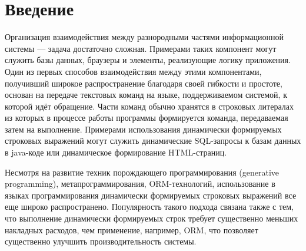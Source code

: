 \section*{Введение}
Организация взаимодействия между разнородными частями информационной системы — задача достаточно сложная. Примерами таких компонент могут служить базы данных, браузеры и элементы, реализующие логику приложения. Один из первых способов взаимодействия между этими компонентами, получивший широкое распространение благодаря своей гибкости и простоте, основан на передаче текстовых команд на языке, поддерживаемом системой, к которой идёт обращение. Части команд обычно хранятся в строковых литералах из которых в процессе работы программы формируется команда, передаваемая затем на выполнение. Примерами использования динамически формируемых строковых выражений могут служить динамические SQL-запросы к базам данных в java-коде или динамическое формирование HTML-страниц.   

Несмотря на развитие техник порождающего программирования (generative programming), метапрограммирования, ORM-технологий, использование в языках программирования динамически формируемых строковых выражений все еще широко распространено. Популярность такого подхода связана также с тем, что выполнение динамически формируемых строк требует существенно меньших накладных расходов, чем применение, например, ORM, что позволяет существенно улучшить производительность системы.


